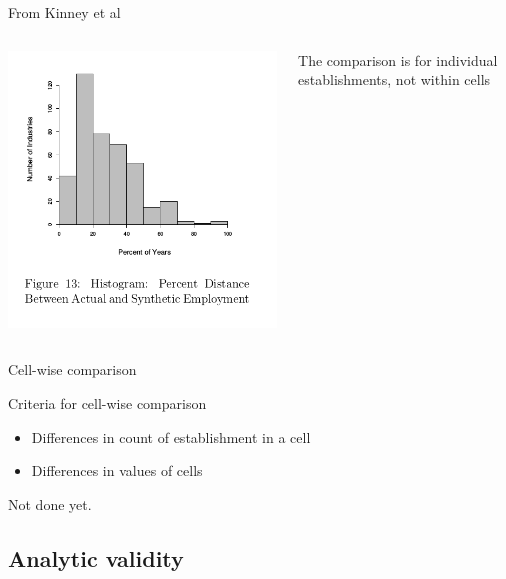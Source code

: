 \begin{frame}{From Kinney et al}
\begin{columns}
\begin{column}{0.6\textwidth}
\includegraphics[height=0.8\textheight]{CES-WP-11-04-page40-figure13}
\end{column}
\begin{column}{0.3\textwidth}
The comparison is for individual establishments, not within cells
\end{column}
\end{columns}
\end{frame}

\begin{frame}{Cell-wise comparison}
\begin{block}{Criteria for cell-wise comparison}
\begin{itemize}
\item Differences in count of establishment in a cell
\item Differences in values of cells
\end{itemize}
\end{block}
Not done yet.
\end{frame}


\subsection{Analytic validity}


